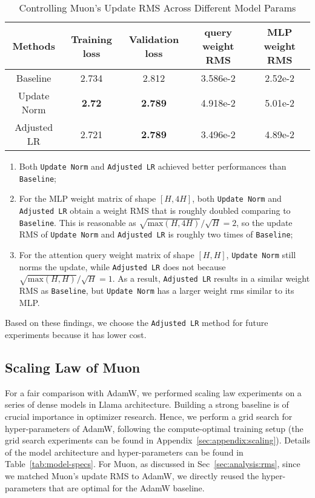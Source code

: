 \begin{table}[t]
\small
\centering
\caption{Controlling Muon's Update RMS Across Different Model Params}
\label{tab:muon-params-rms}
\begin{tabular}{c|c|c|c|c}
\toprule
Methods & Training loss & Validation loss & query weight RMS & MLP weight RMS \\
\midrule
Baseline & 2.734 & 2.812 & 3.586e-2 & 2.52e-2 \\
Update Norm & \textbf{2.72} & \textbf{2.789} & 4.918e-2 & 5.01e-2 \\
Adjusted LR & 2.721 & \textbf{2.789} & 3.496e-2 & 4.89e-2 \\
\bottomrule
\end{tabular}
\end{table}

\begin{enumerate}
    \item Both \texttt{Update Norm} and \texttt{Adjusted LR} achieved better performances than \texttt{Baseline};
    
    \item For the MLP weight matrix of shape $[H, 4H]$, both \texttt{Update Norm} and \texttt{Adjusted LR} obtain a weight RMS that is roughly doubled comparing to \texttt{Baseline}. This is reasonable as $\sqrt{\text{max}(H,4H)} / \sqrt{H} = 2$, so the update RMS of \texttt{Update Norm} and \texttt{Adjusted LR} is roughly two times of \texttt{Baseline};
    
    \item For the attention query weight matrix of shape $[H, H]$, \texttt{Update Norm} still norms the update, while \texttt{Adjusted LR} does not because $\sqrt{\text{max}(H,H)} / \sqrt{H} = 1$. As a result, \texttt{Adjusted LR} results in a similar weight RMS as \texttt{Baseline}, but \texttt{Update Norm} has a larger weight rms similar to its MLP.
\end{enumerate}

Based on these findings, we choose the \texttt{Adjusted LR} method for future experiments because it has lower cost.

\subsection{Scaling Law of Muon}
\label{sec:exp:moonscalinglaw}

For a fair comparison with AdamW, we performed scaling law experiments on a series of dense models in Llama \citep{grattafiori2024llama3herdmodels} architecture. Building a strong baseline is of crucial importance in optimizer research. Hence, we perform a grid search for hyper-parameters of AdamW, following the compute-optimal training setup \citep{kaplan2020scalinglawsneurallanguage} (the grid search experiments can be found in Appendix~\ref{sec:appendix:scaling}). Details of the model architecture and hyper-parameters can be found in Table~\ref{tab:model-specs}. For Muon, as discussed in Sec~\ref{sec:analysis:rms}, since we matched Muon's update RMS to AdamW, we directly reused the hyper-parameters that are optimal for the AdamW baseline.

